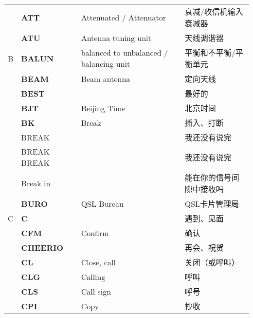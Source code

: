 \begin{longtable}[l]{llll}
    & \textbf{ATT}                      & Attenuated / Attenuator                 & 衰减/收信机输入衰减器         \\
    & \textbf{ATU}                      & Antenna tuning unit                     & 天线调谐器               \\
  B & \textbf{BALUN}                    & balanced to unbalanced / balancing unit & 平衡和不平衡/平衡单元         \\
    & \textbf{BEAM}                     & Beam antenna                            & 定向天线                \\
    & \textbf{BEST}                     &                                         & 最好的                 \\
    & \textbf{BJT}                      & Beijing Time                            & 北京时间                \\
    & \textbf{BK}                       & Break                                   & 插入、打断               \\
    & BREAK                             &                                         & 我还没有说完              \\
    & BREAK BREAK                       &                                         & 我还没有说完              \\
    & Break in                          &                                         & 能在你的信号间隙中接收吗        \\
    & \textbf{BURO}                     & QSL Bureau                              & QSL卡片管理局            \\
  C & \textbf{C}                        &                                         & 遇到、见面               \\
    & \textbf{CFM}                      & Confirm                                 & 确认                  \\
    & \textbf{CHEERIO}                  &                                         & 再会、祝贺               \\
    & \textbf{CL}                       & Close, call                             & 关闭（或呼叫）             \\
    & \textbf{CLG}                      & Calling                                 & 呼叫                  \\
    & \textbf{CLS}                      & Call sign                               & 呼号                  \\
    & \textbf{CPI}                      & Copy                                    & 抄收                  \\

\end{longtable}

